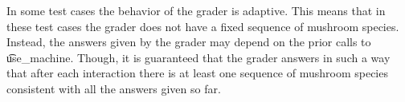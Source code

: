 In some test cases the behavior of the grader is adaptive. This means that in these test cases the grader does not have a fixed sequence of mushroom species. Instead, the answers given by the grader may depend on the prior calls to \t{use\_machine}. Though, it is guaranteed that the grader answers in such a way that after each interaction there is at least one sequence of mushroom species consistent with all the answers given so far.